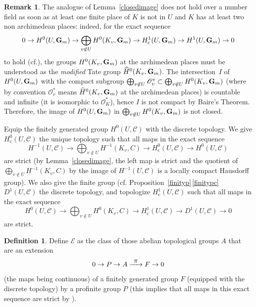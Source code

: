 \documentclass[10pt,a4paper]{amsart}
\newcommand{\cf}{cf.\xspace}
\let\mathcal\mathscr
\newcommand\To[1]{\mathchoice{\xrightarrow{\textstyle\kern4pt#1\kern3pt}}{\stackrel{#1}{\longrightarrow}}{}{}}
\newcommand{\rc}{\mathrm{c}}
\theoremstyle{plain}
\theoremstyle{definition}
\newtheorem{defi}[theo]{Definition}
\newtheorem{rema}[theo]{Remark}
\newcommand\cO {\mathcal{O}}
\newcommand \cC {\mathcal{C}}
\begin{document}
\begin{rema} \label{nocdn}
The analogue of Lemma~\ref{closedimage} does not hold over a number field
as soon as at least one finite place of $K$ is not in $U$ and $K$ has at
least two non archimedean places: indeed, for the exact sequence\vspace*{-3pt}
\[
0 \to H^0(U,\G) \to \bigoplus_{v \not \in U} H^0(K_v,\G) \to
H^1_\rc(U,\G) \to H^1(U,\G) \to 0
\]
to hold (\cf \cite[beginning of \S 2]{DemH}),
the groups $H^0(K_v,\mathbf{G}_m)$ at the archimedean places
must be understood as the \emph{modified} Tate group ${\widehat H}^0(K_v,\mathbf{G}_m)$.
The intersection~$I$ of~$H^0(U,\mathbf{G}_m)$ with
the compact subgroup
$\bigoplus_{v \not \in U} \cO_v^* \subset
\bigoplus_{v \not \in U} H^0(K_v,\G) $ (where by convention $\cO_v^*$
means ${\widehat H}^0(K_v,\mathbf{G}_m)$ at the archimedean places) is countable
and infinite (it is isomorphic to $\cO_K^*$),
hence $I$ is not compact by Baire's Theorem.
Therefore, the image of $H^0(U,\mathbf{G}_m)$ in $\bigoplus_{v \not \in U} H^0(K_v,\mathbf{G}_m)$
is not closed.
\end{rema}

Equip the finitely generated group $H^0(U,\cC)$ with the discrete
topology. We give $H^0_\rc(U, \cC)$ the unique topology such that all maps in
the exact sequence
\begin{equation} \label {toph0c}
H^{-1}(U,\cC)
\to \bigoplus_{v \not \in U} H^{-1}(K_v,C) \to H^0_\rc(U, \cC) \to H^0(U,\cC)
\end{equation}
are strict (by Lemma~\ref{closedimage}, the left map is strict and the
quotient of $\bigoplus_{v \not \in U} H^{-1}(K_v,C)$ by the image of
$H^{-1}(U,\cC)$ is a locally compact Hausdorff group).
We also give the finite group (\cf Proposition~\ref{finityp}\,\eqref{finitypc}
$D^1(U,\cC)$ the discrete topology, and topologize $H^1_\rc(U,\cC)$ such that
all maps in the exact sequence
\begin{equation} \label {toph1c}
H^0(U,\cC) \to \bigoplus_{v \not \in U} H^0(K_v,C) \to H^1_\rc(U, \cC) \to D^1(U,\cC) \to 0
\end{equation}
are strict.

\begin{defi}
Define ${\mathcal E}$ as the class of those abelian topological groups
$A$ that are an extension
\begin{equation} \label{extgroup}
0 \to P \to A \To{\pi}F \to 0
\end{equation}
(the maps being continuous)
of a finitely generated group $F$ (equipped with the
discrete topology) by a profinite group $P$ (this implies that all maps
in this exact sequence are strict by \cite[Lem.\,3.4]{DemH}).
\end{defi}
\end{document}
